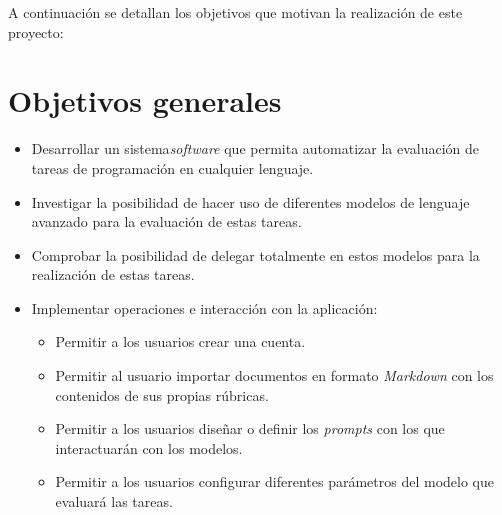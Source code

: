 
A continuación se detallan los objetivos que motivan la realización de este proyecto:

\section{Objetivos generales}\label{objetivos_generales}

\begin{itemize}
    \item Desarrollar un sistema\textit{software} que permita automatizar la evaluación de tareas de programación en cualquier lenguaje.
    \item Investigar la posibilidad de hacer uso de diferentes modelos de lenguaje avanzado para la evaluación de estas tareas.
    \item Comprobar la posibilidad de delegar totalmente en estos modelos para la realización de estas tareas.
    \item Implementar operaciones e interacción con la aplicación:
    \begin{itemize}
        \item Permitir a los usuarios crear una cuenta.
        \item Permitir al usuario importar documentos en formato \textit{Markdown} con los contenidos de sus propias rúbricas.
        \item Permitir a los usuarios diseñar o definir los \textit{prompts} con los que interactuarán con los modelos.
        \item Permitir a los usuarios configurar diferentes parámetros del modelo que evaluará las tareas.
    \end{itemize}
\end{itemize}

